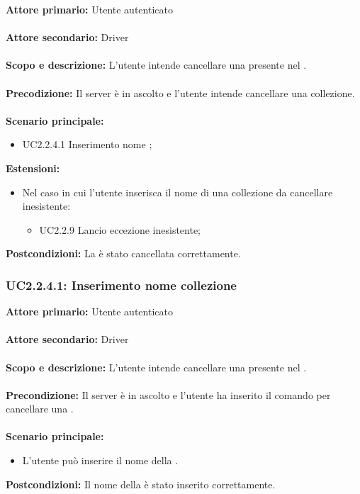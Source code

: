 \documentclass{scalatekids-article}
\begin{document}
\textbf{Attore primario:} Utente autenticato\\ \\
\textbf{Attore secondario:} Driver\\ \\
\textbf{Scopo e descrizione:} L’utente intende cancellare una  presente nel .\\ \\
\textbf{Precodizione:} Il server è in ascolto e l’utente intende cancellare una collezione.\\ \\
\textbf{Scenario principale:}
\begin{itemize}
\item UC2.2.4.1 Inserimento nome ;
\end{itemize}
\textbf{Estensioni:}
\begin{itemize}
\item Nel caso in cui l'utente inserisca il nome di una collezione da cancellare inesistente:
  \begin{itemize}
  \item UC2.2.9 Lancio eccezione  inesistente;
  \end{itemize}
\end{itemize}
\textbf{Postcondizioni:} La  è stato cancellata correttamente.

\subsubsection{UC2.2.4.1: Inserimento nome collezione}

\textbf{Attore primario:} Utente autenticato\\ \\
\textbf{Attore secondario:} Driver\\ \\
\textbf{Scopo e descrizione:} L’utente intende cancellare una  presente nel .\\ \\
\textbf{Precondizione:} Il server è in ascolto e l’utente ha inserito il comando per cancellare una .\\ \\
\textbf{Scenario principale:}
\begin{itemize}
\item L'utente può inserire il nome della .
\end{itemize}
\textbf{Postcondizioni:} Il nome della  è stato inserito correttamente.
\end{document}
